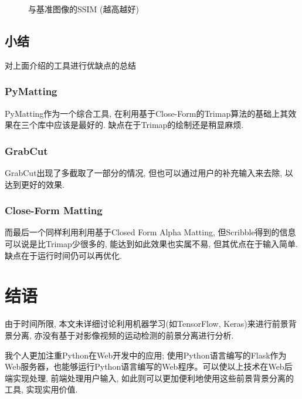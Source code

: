 \documentclass[scheme=chinese,a4paper]{article}
\begin{document}
\begin{figure}[H]
\centering
{}
\caption{与基准图像的SSIM (越高越好)}
\label{fig:ssim}
\end{figure}
\subsection{小结}
对上面介绍的工具进行优缺点的总结
\subsubsection{PyMatting}
PyMatting作为一个综合工具, 在利用基于Close-Form的Trimap算法的基础上其效果在三个库中应该是最好的. 缺点在于Trimap的绘制还是稍显麻烦. 
\subsubsection{GrabCut}
 GrabCut出现了多截取了一部分的情况, 但也可以通过用户的补充输入来去除, 以达到更好的效果. 
\subsubsection{Close-Form Matting}
而最后一个同样利用利用基于Closed Form Alpha Matting, 但Scribble得到的信息可以说是比Trimap少很多的, 能达到如此效果也实属不易, 但其优点在于输入简单. 缺点在于运行时间仍可以再优化. 

\section{结语}
由于时间所限, 本文未详细讨论利用机器学习(如TensorFlow, Keras)来进行前景背景分离, 亦没有基于对影像视频的运动检测的前景分离进行分析. 

我个人更加注重Python在Web开发中的应用; 使用Python语言编写的Flask作为Web服务器，也能够运行Python语言编写的Web程序。可以使以上技术在Web后端实现处理, 前端处理用户输入, 如此则可以更加便利地使用这些前景背景分离的工具, 实现实用价值. 

\printbibliography
\end{document}
